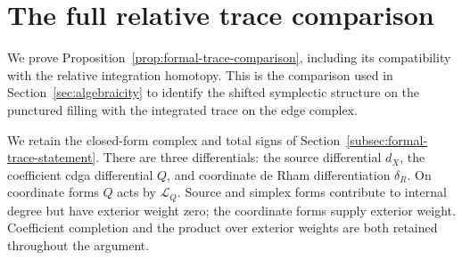 \section{The full relative trace comparison}
\label{app:formal-trace-comparison}

We prove Proposition~\ref{prop:formal-trace-comparison}, including its
compatibility with the relative integration homotopy.  This is the
comparison used in Section~\ref{sec:algebraicity} to identify the
shifted symplectic structure on the punctured filling with the integrated
trace on the edge complex.

We retain the closed-form complex and total signs of
Section~\ref{subsec:formal-trace-statement}.  There are three
differentials: the source differential \(d_X\), the coefficient
cdga differential \(Q\), and coordinate de Rham differentiation
\(\delta_R\).  On coordinate forms \(Q\) acts by
\(\mathcal L_Q\).  Source and simplex forms contribute to internal
degree but have exterior weight zero; the coordinate forms supply
exterior weight.  Coefficient completion and the product over exterior
weights are both retained throughout the argument.


